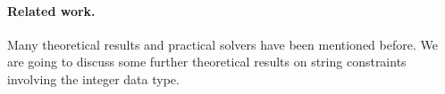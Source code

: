 
%
%
%
%
%
 

\paragraph*{Related work.}
Many theoretical results and practical solvers have been mentioned before. We are going to discuss some further theoretical results on string constraints involving the integer data type.
%
%
%
%
